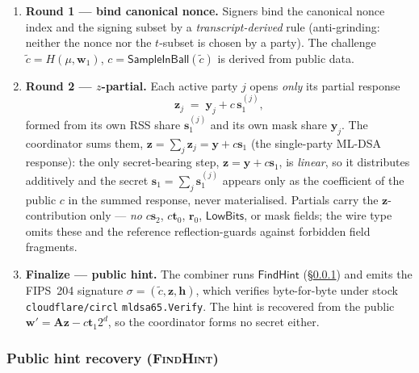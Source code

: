 \begin{enumerate}[leftmargin=2em, nosep]
\item \textbf{Round 1 --- bind canonical nonce.} Signers bind the
      canonical nonce index and the signing subset by a
      \emph{transcript-derived} rule (anti-grinding: neither the nonce
      nor the $t$-subset is chosen by a party). The challenge
      $\tilde c = H(\mu, \mathbf{w}_1)$, $c = \mathsf{SampleInBall}(\tilde
      c)$ is derived from public data.
\item \textbf{Round 2 --- $z$-partial.} Each active party $j$ opens
      \emph{only} its partial response
      \[
        \mathbf{z}_j \;=\; \mathbf{y}_j + c\,\mathbf{s}_1^{(j)},
      \]
      formed from its own RSS share $\mathbf{s}_1^{(j)}$ and its own mask
      share $\mathbf{y}_j$. The coordinator sums them,
      $\mathbf{z} = \sum_{j} \mathbf{z}_j = \mathbf{y} + c\mathbf{s}_1$
      (the single-party ML-DSA response): the only secret-bearing step,
      $\mathbf{z} = \mathbf{y} + c\mathbf{s}_1$, is \emph{linear}, so it
      distributes additively and the secret $\mathbf{s}_1 = \sum_j
      \mathbf{s}_1^{(j)}$ appears only as the coefficient of the public
      $c$ in the summed response, never materialised. Partials carry the
      $\mathbf{z}$-contribution only --- \emph{no} $c\mathbf{s}_2$,
      $c\mathbf{t}_0$, $\mathbf{r}_0$, $\mathsf{LowBits}$, or mask fields;
      the wire type omits these and the reference reflection-guards
      against forbidden field fragments.
\item \textbf{Finalize --- public hint.} The combiner runs
      $\mathsf{FindHint}$ (\S\ref{sec:protocol:bcc:hint}) and emits the
      FIPS~204 signature $\sigma = (\tilde c, \mathbf{z}, \mathbf{h})$,
      which verifies byte-for-byte under stock \texttt{cloudflare/circl}
      \texttt{mldsa65.Verify}. The hint is recovered from the public
      $\mathbf{w}' = \mathbf{A}\mathbf{z} - c\mathbf{t}_1 2^d$, so the
      coordinator forms no secret either.
\end{enumerate}

\subsubsection{Public hint recovery (\textsc{FindHint})}
\label{sec:protocol:bcc:hint}

